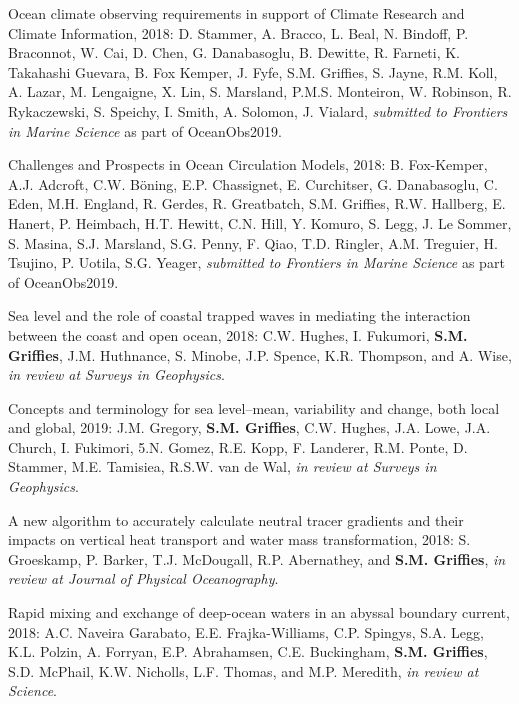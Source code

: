 \begin{etaremune}
\item Ocean climate observing requirements in support of Climate Research and Climate Information, 2018: D. Stammer, A. Bracco, L. Beal, N. Bindoff, P. Braconnot, W. Cai, D. Chen, G. Danabasoglu, B. Dewitte, R. Farneti, K. Takahashi Guevara, B. Fox Kemper, J. Fyfe, S.M. Griffies, S. Jayne, R.M. Koll, A. Lazar, M. Lengaigne, X. Lin, S. Marsland, P.M.S. Monteiron, W. Robinson, R. Rykaczewski, S. Speichy, I. Smith, A. Solomon, J. Vialard, {\it submitted to Frontiers in Marine Science} as part of OceanObs2019.

\item Challenges and Prospects in Ocean Circulation Models, 2018: B. Fox-Kemper, A.J. Adcroft, C.W. {B\"{o}ning}, E.P. Chassignet, E. Curchitser, G. Danabasoglu, C. Eden, M.H. England, R. Gerdes, R. Greatbatch, S.M. Grif\/f\/ies, R.W. Hallberg, E. Hanert, P. Heimbach, H.T. Hewitt, C.N. Hill, Y. Komuro, S. Legg, J. Le Sommer, S. Masina, S.J. Marsland, S.G. Penny, F. Qiao, T.D. Ringler, A.M. Treguier, H. Tsujino, P. Uotila, S.G. Yeager,
{\it submitted to Frontiers in Marine Science} as part of OceanObs2019.

\item Sea level and the role of coastal trapped waves in mediating the interaction between the coast and open ocean, 2018: C.W. Hughes, I. Fukumori, {\bf S.M. Grif\/f\/ies}, J.M. Huthnance, S. Minobe, J.P. Spence, K.R. Thompson, and A. Wise, {\it in review at Surveys in Geophysics}.

\item Concepts and terminology for sea level--mean, variability and change, both local and global, 2019: J.M. Gregory, {\bf S.M. Grif\/f\/ies}, C.W. Hughes, J.A. Lowe, J.A. Church, I. Fukimori, 5.N. Gomez, R.E. Kopp, F. Landerer, R.M. Ponte, D. Stammer, M.E. Tamisiea, R.S.W. van de Wal, {\it in review at Surveys in Geophysics}.

\item A new algorithm to accurately calculate neutral tracer gradients and their impacts on vertical heat transport and water mass transformation, 2018: S. Groeskamp, P. Barker, T.J. McDougall, R.P. Abernathey, and {\bf S.M. Grif\/f\/ies}, {\it in review at Journal of Physical Oceanography}.

\item Rapid mixing and exchange of deep-ocean waters in an abyssal boundary current, 2018: A.C. Naveira Garabato, E.E. Frajka-Williams, C.P. Spingys, S.A. Legg, K.L. Polzin, A. Forryan, E.P. Abrahamsen, C.E. Buckingham, {\bf S.M. Grif\/f\/ies}, S.D. McPhail, K.W. Nicholls, L.F. Thomas, and M.P. Meredith,  {\it in review at Science}.


\end{etaremune}
